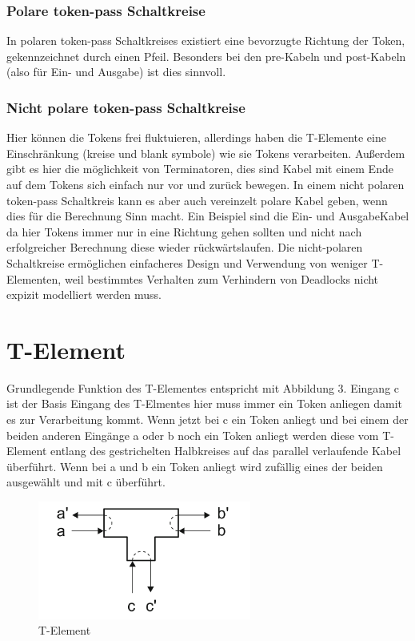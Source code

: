 \documentclass[11pt,a4paper]{article}
\begin{document}
\subsubsection{Polare token-pass Schaltkreise}
In polaren token-pass Schaltkreises existiert eine bevorzugte Richtung
der Token, gekennzeichnet durch einen Pfeil.
%
Besonders bei den pre-Kabeln und post-Kabeln (also für Ein- und Ausgabe)
ist dies sinnvoll.

\subsubsection{Nicht polare token-pass Schaltkreise}
Hier können die Tokens frei fluktuieren, allerdings haben die T-Elemente eine
Einschränkung (kreise und blank symbole) wie sie Tokens verarbeiten.
%
Außerdem gibt es hier die möglichkeit von Terminatoren, dies sind Kabel
mit einem Ende auf dem Tokens sich einfach nur vor und zurück bewegen.
%
In einem nicht polaren token-pass Schaltkreis kann es aber auch vereinzelt
polare Kabel geben, wenn dies für die Berechnung Sinn macht.
%
Ein Beispiel sind die Ein- und AusgabeKabel da hier Tokens immer nur in eine 
Richtung gehen sollten und nicht nach erfolgreicher Berechnung diese 
wieder rückwärtslaufen.
%
Die nicht-polaren Schaltkreise ermöglichen einfacheres Design und Verwendung
von weniger T-Elementen, weil bestimmtes Verhalten zum Verhindern von
Deadlocks nicht expizit modelliert werden muss.

\section{T-Element}
Grundlegende Funktion des T-Elementes entspricht mit Abbildung 3.
%
Eingang c ist der Basis Eingang des T-Elmentes hier muss immer ein Token
anliegen damit es zur Verarbeitung kommt.
%
Wenn jetzt bei c ein Token anliegt und bei einem der beiden anderen
Eingänge a oder b noch ein Token anliegt werden diese vom T-Element 
entlang des gestrichelten Halbkreises auf das parallel verlaufende 
Kabel überführt.
%
Wenn bei a und b ein Token anliegt wird zufällig 
eines der beiden ausgewählt und mit c überführt.

\begin{figure}[h]
    \centering
    \includegraphics[width=7cm]{bilder/T_Element.png}
    \caption{T-Element}
\end{figure}    
\end{document}
